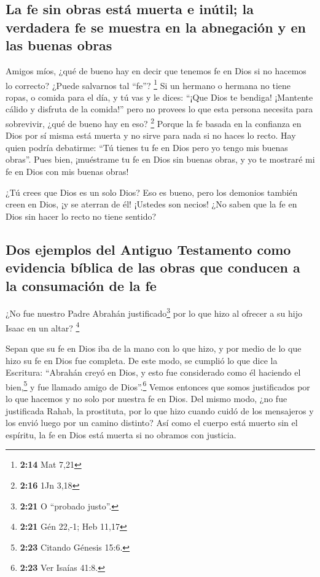 \hypertarget{la-fe-sin-obras-estuxe1-muerta-e-inuxfatil-la-verdadera-fe-se-muestra-en-la-abnegaciuxf3n-y-en-las-buenas-obras}{%
\subsection{La fe sin obras está muerta e inútil; la verdadera fe se
muestra en la abnegación y en las buenas
obras}\label{la-fe-sin-obras-estuxe1-muerta-e-inuxfatil-la-verdadera-fe-se-muestra-en-la-abnegaciuxf3n-y-en-las-buenas-obras}}

 Amigos míos, ¿qué de bueno hay en decir que tenemos fe
en Dios si no hacemos lo correcto? ¿Puede salvarnos tal ``fe''?
\footnote{\textbf{2:14} Mat 7,21}  Si un hermano o
hermana no tiene ropas, o comida para el día,  y tú vas y
le dices: ``¡Que Dios te bendiga! ¡Mantente cálido y disfruta de la
comida!'' pero no provees lo que esta persona necesita para sobrevivir,
¿qué de bueno hay en eso? \footnote{\textbf{2:16} 1Jn 3,18}
 Porque la fe basada en la confianza en Dios por sí misma
está muerta y no sirve para nada si no haces lo recto. 
Hay quien podría debatirme: ``Tú tienes tu fe en Dios pero yo tengo mis
buenas obras''. Pues bien, ¡muéstrame tu fe en Dios sin buenas obras, y
yo te mostraré mi fe en Dios con mis buenas obras!

 ¿Tú crees que Dios es un solo Dios? Eso es bueno, pero
los demonios también creen en Dios, ¡y se aterran de él! 
¡Ustedes son necios! ¿No saben que la fe en Dios sin hacer lo recto no
tiene sentido?

\hypertarget{dos-ejemplos-del-antiguo-testamento-como-evidencia-buxedblica-de-las-obras-que-conducen-a-la-consumaciuxf3n-de-la-fe}{%
\subsection{Dos ejemplos del Antiguo Testamento como evidencia bíblica
de las obras que conducen a la consumación de la
fe}\label{dos-ejemplos-del-antiguo-testamento-como-evidencia-buxedblica-de-las-obras-que-conducen-a-la-consumaciuxf3n-de-la-fe}}

 ¿No fue nuestro Padre Abrahán justificado\footnote{\textbf{2:21}
  O ``probado justo''.} por lo que hizo al ofrecer a su hijo Isaac en un
altar? \footnote{\textbf{2:21} Gén 22,-1; Heb 11,17}

 Sepan que su fe en Dios iba de la mano con lo que hizo,
y por medio de lo que hizo su fe en Dios fue completa. 
De este modo, se cumplió lo que dice la Escritura: ``Abrahán creyó en
Dios, y esto fue considerado como él haciendo el bien,\footnote{\textbf{2:23}
  Citando Génesis 15:6.} y fue llamado amigo de Dios''.\footnote{\textbf{2:23}
  Ver Isaías 41:8.}  Vemos entonces que somos
justificados por lo que hacemos y no solo por nuestra fe en Dios.
 Del mismo modo, ¿no fue justificada Rahab, la
prostituta, por lo que hizo cuando cuidó de los mensajeros y los envió
luego por un camino distinto?  Así como el cuerpo está
muerto sin el espíritu, la fe en Dios está muerta si no obramos con
justicia.


